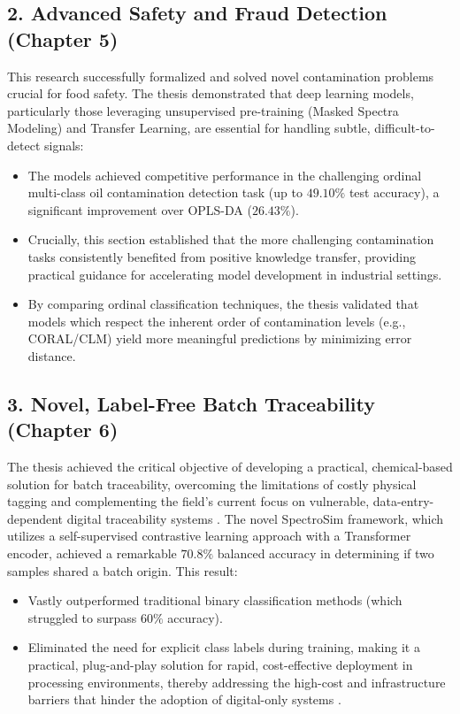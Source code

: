 \subsection*{2. Advanced Safety and Fraud Detection (Chapter 5)}

This research successfully formalized and solved novel contamination problems crucial for food safety. The thesis demonstrated that deep learning models, particularly those leveraging unsupervised pre-training (Masked Spectra Modeling) and Transfer Learning, are essential for handling subtle, difficult-to-detect signals:
\begin{itemize}
\item The models achieved competitive performance in the challenging ordinal multi-class oil contamination detection task (up to $49.10\%$ test accuracy), a significant improvement over OPLS-DA ($26.43\%$).
\item Crucially, this section established that the more challenging contamination tasks consistently benefited from positive knowledge transfer, providing practical guidance for accelerating model development in industrial settings.
\item By comparing ordinal classification techniques, the thesis validated that models which respect the inherent order of contamination levels (e.g., CORAL/CLM) yield more meaningful predictions by minimizing error distance.
\end{itemize}

\subsection*{3. Novel, Label-Free Batch Traceability (Chapter 6)}

The thesis achieved the critical objective of developing a practical, chemical-based solution for batch traceability, overcoming the limitations of costly physical tagging \citep{Mai2010} and complementing the field's current focus on vulnerable, data-entry-dependent digital traceability systems \citep{turkson2025digital, jiang2025traceability}. The novel SpectroSim framework, which utilizes a self-supervised contrastive learning approach with a Transformer encoder, achieved a remarkable $70.8\%$ balanced accuracy in determining if two samples shared a batch origin. This result:
\begin{itemize}
\item Vastly outperformed traditional binary classification methods (which struggled to surpass $60\%$ accuracy).
\item Eliminated the need for explicit class labels during training, making it a practical, plug-and-play solution for rapid, cost-effective deployment in processing environments, thereby addressing the high-cost and infrastructure barriers that hinder the adoption of digital-only systems \citep{Untal2025}.
\end{itemize}

